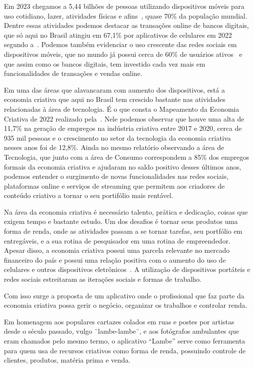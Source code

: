 Em 2023 chegamos a 5,44 bilhões de pessoas utilizando dispositivos móveis para uso cotidiano, lazer, atividades físicas e afins~\cite{wearesocial}, quase 70\% da população mundial.
Dentre essas atividades podemos destacar as transações online de bancos digitais, que só aqui no Brasil atingiu em 67,1\% por aplicativos de celulares em 2022 segundo a~.
Podemos também evidenciar o uso crescente das redes sociais em dispositivos móveis, que no mundo já possui cerca de 60\% de usuários ativos~\cite{wearesocial} e que assim como os bancos digitais, tem investido cada vez mais em funcionalidades de transações e vendas online.

Em uma das áreas que alavancaram com aumento dos dispositivos, está a economia criativa que aqui no Brasil tem crescido bastante nas atividades relacionadas à área de tecnologia.
É o que consta o Mapeamento da Economia Criativa de 2022 realizado pela~.
Nele podemos observar que houve uma alta de 11,7\% na geração de empregos na indústria criativa entre 2017 e 2020, cerca de 935 mil pessoas e o crescimento no setor da tecnologia da economia criativa nesses anos foi de 12,8\%.
Ainda no mesmo relatório observando a área de Tecnologia, que junto com a área de Consumo correspondem a 85\% dos empregos formais da economia criativa e ajudaram no saldo positivo desses últimos anos, podemos entender o surgimento de novas funcionalidades nas redes sociais, plataformas online e serviços de streaming que permitem aos criadores de conteúdo criativo a tornar o seu portifólio mais rentável.

Na área da economia criativa é necessário talento, prática e dedicação, coisas que exigem tempo e bastante estudo.
Um dos desafios é tornar seus produtos uma forma de renda, onde as atividades passam a se tornar tarefas, seu portfólio em entregáveis, e a sua rotina de pesquisador em uma rotina de empreendedor.
Apesar disso, a economia criativa possui uma parcela relevante no mercado financeiro do país e possui uma relação positiva com o aumento do uso de celulares e outros dispositivos eletrônicos~.
A utilização de dispositivos portáteis e redes sociais estreitaram as iterações sociais e formas de trabalho.

Com isso surge a proposta de um aplicativo onde o profissional que faz parte da economia criativa possa gerir o negócio, organizar os trabalhos e controlar renda.

Em homenagem aos populares cartazes colados em ruas e postes por artistas desde o século passado, vulgo ¨lambe-lambe¨, e aos fotógrafos ambulantes que eram chamados pelo mesmo termo, o aplicativo “Lambe” serve como ferramenta para quem usa de recursos criativos como forma de renda, possuindo controle de clientes, produtos, matéria prima e venda.

